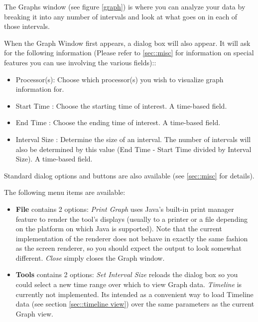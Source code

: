 \documentclass[10pt]{article}
\begin{document}

The Graphs window (see figure \ref{graph}) is where you can analyze your data by breaking it
into any number of intervals and look at what goes on in each of those
intervals.


When the Graph Window first appears, a dialog box will also appear. It
will ask for the following information (Please refer to
\ref{sec::misc} for information on special features you can
use involving the various fields)::

\begin{itemize}
\item
Processor(s): Choose which processor(s) you wish to visualize graph 
information for.
\item
Start Time : Choose the starting time of interest. A time-based field.
\item
End Time : Choose the ending time of interest. A time-based field.
\item
Interval Size : Determine the size of an interval. The number of intervals
will also be determined by this value (End Time - Start Time divided by
Interval Size). A time-based field.
\end{itemize}

Standard \projections{} dialog options and buttons are also available
(see \ref{sec::misc} for details).

The following menu items are available:

\begin{itemize}
\item
{\bf File} contains 2 options: {\it Print Graph} uses Java's built-in 
print manager feature to render the tool's displays (usually to a printer 
or a file depending on the platform on which Java is supported). Note that
the current implementation of the renderer does not behave in exactly the
same fashion as the screen renderer, so you should expect the output to look
somewhat different. {\it Close} simply closes the Graph window.
\item
{\bf Tools} contains 2 options: {\it Set Interval Size} reloads the dialog
box so you could select a new time range over which to view Graph data.
{\it Timeline} is currently not implemented. Its intended as a convenient
way to load Timeline data (see section \ref{sec::timeline view}) over the 
same parameters as the current Graph view.
\end{itemize}

\end{document}
